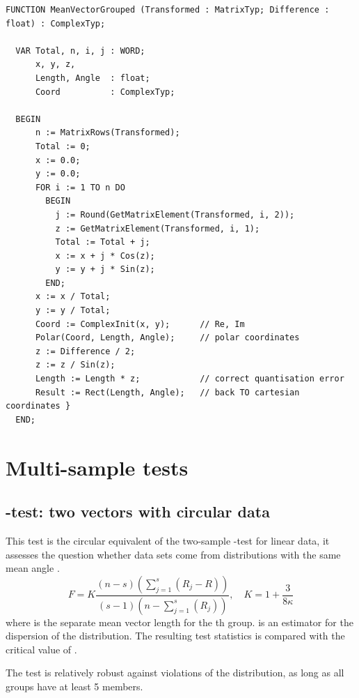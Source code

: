 \begin{refsection}
\begin{lstlisting}[caption=Mean direction of grouped data]
  FUNCTION MeanVectorGrouped (Transformed : MatrixTyp; Difference : float) : ComplexTyp;

  VAR Total, n, i, j : WORD;
      x, y, z,
      Length, Angle  : float;
      Coord          : ComplexTyp;

  BEGIN
      n := MatrixRows(Transformed);
      Total := 0;
      x := 0.0;
      y := 0.0;
      FOR i := 1 TO n DO
        BEGIN
          j := Round(GetMatrixElement(Transformed, i, 2));
          z := GetMatrixElement(Transformed, i, 1);
          Total := Total + j;
          x := x + j * Cos(z);
          y := y + j * Sin(z);
        END;
      x := x / Total;
      y := y / Total;
      Coord := ComplexInit(x, y);      // Re, Im
      Polar(Coord, Length, Angle);     // polar coordinates
      z := Difference / 2;
      z := z / Sin(z);
      Length := Length * z;            // correct quantisation error
      Result := Rect(Length, Angle);   // back TO cartesian coordinates }
  END;
\end{lstlisting}

\section{Multi-sample tests}

\subsection{-test: two vectors with circular data}

This test is the circular equivalent of the two-sample -test for linear data, it assesses the question whether  data sets come from distributions with the same mean angle \parencite{wat-56, Ste-69}.
\begin{equation}
  F = K \frac{(n - s)(\sum_{j=1}^s(R_j - R))}{(s-1) (n - \sum_{j=1}^s(R_j))}, \quad K = 1 + \frac{3}{8\kappa}
\end{equation}
where  is the separate mean vector length for the th group. \skalar{\kappa} is an estimator for the dispersion of the  distribution. The resulting test statistics is compared with the critical value of .

The test is relatively robust against violations of the  distribution, as long as all groups have at least \num{5} members.


\end{refsection}
